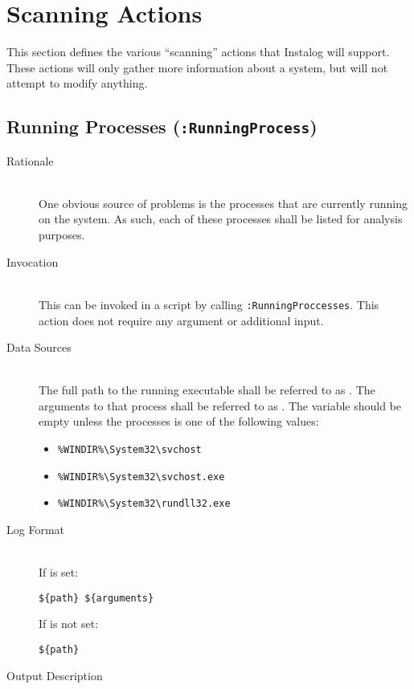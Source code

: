 \section{Scanning Actions} \label{sec:scanning_actions}
This section defines the various ``scanning'' actions that Instalog will
support.  These actions will only gather more information about a system, but
will not attempt to modify anything.

\subsection{Running Processes (\texttt{:RunningProcess})}
\begin{description}
\item[Rationale] \hfill \\
One obvious source of problems is the processes that are currently running on
the system.  As such, each of these processes shall be listed for analysis
purposes.  
\item[Invocation] \hfill \\
This can be invoked in a script by calling \verb|:RunningProccesses|.  This
action does not require any argument or additional input.
\item[Data Sources] \hfill \\
The full path to the running executable shall be referred to as .  The
arguments to that process shall be referred to as .  The
 variable should be empty unless the processes is one of the
following values:
\begin{itemize}
  \item \verb|%WINDIR%\System32\svchost|
  \item \verb|%WINDIR%\System32\svchost.exe|
  \item \verb|%WINDIR%\System32\rundll32.exe|
\end{itemize}
\item[Log Format] \hfill \\
If  is set:
\vspace{-\baselineskip}
\begin{verbatim}
${path} ${arguments}
\end{verbatim}
If  is not set:
\vspace{-\baselineskip}
\begin{verbatim}
${path} 
\end{verbatim}
\item[Output Description] \hfill \\

\end{description}
